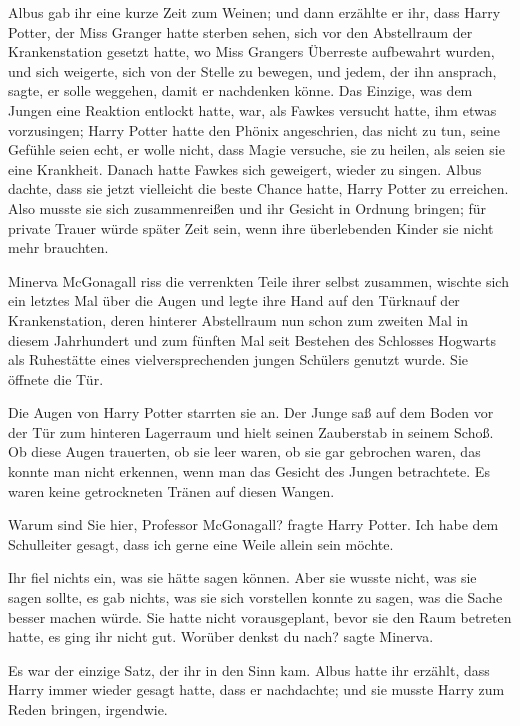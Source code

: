 Albus gab ihr eine kurze Zeit zum Weinen; und dann erzählte er ihr, dass Harry
Potter, der Miss Granger hatte sterben sehen, sich vor den Abstellraum der
Krankenstation gesetzt hatte, wo Miss Grangers Überreste aufbewahrt wurden, und
sich weigerte, sich von der Stelle zu bewegen, und jedem, der ihn ansprach,
sagte, er solle weggehen, damit er nachdenken könne. Das Einzige, was dem Jungen
eine Reaktion entlockt hatte, war, als Fawkes versucht hatte, ihm etwas
vorzusingen; Harry Potter hatte den Phönix angeschrien, das nicht zu tun, seine
Gefühle seien echt, er wolle nicht, dass Magie versuche, sie zu heilen, als
seien sie eine Krankheit. Danach hatte Fawkes sich geweigert, wieder zu singen.
Albus dachte, dass sie jetzt vielleicht die beste Chance hatte, Harry Potter zu
erreichen. Also musste sie sich zusammenreißen und ihr Gesicht in Ordnung
bringen; für private Trauer würde später Zeit sein, wenn ihre überlebenden
Kinder sie nicht mehr brauchten.

Minerva McGonagall riss die verrenkten Teile ihrer selbst zusammen, wischte sich
ein letztes Mal über die Augen und legte ihre Hand auf den Türknauf der
Krankenstation, deren hinterer Abstellraum nun schon zum zweiten Mal in diesem
Jahrhundert und zum fünften Mal seit Bestehen des Schlosses Hogwarts als
Ruhestätte eines vielversprechenden jungen Schülers genutzt wurde. Sie öffnete
die Tür.

Die Augen von Harry Potter starrten sie an. Der Junge saß auf dem Boden vor der
Tür zum hinteren Lagerraum und hielt seinen Zauberstab in seinem Schoß. Ob diese
Augen trauerten, ob sie leer waren, ob sie gar gebrochen waren, das konnte man
nicht erkennen, wenn man das Gesicht des Jungen betrachtete. Es waren keine
getrockneten Tränen auf diesen Wangen.

\glqq{}Warum sind Sie hier, Professor McGonagall?\grqq{} fragte Harry Potter.
\glqq{}Ich habe dem Schulleiter gesagt, dass ich gerne eine Weile allein sein
möchte.\grqq{}

Ihr fiel nichts ein, was sie hätte sagen können. Aber sie wusste nicht, was sie
sagen sollte, es gab nichts, was sie sich vorstellen konnte zu sagen, was die
Sache besser machen würde. Sie hatte nicht vorausgeplant, bevor sie den Raum
betreten hatte, es ging ihr nicht gut. \glqq{}Worüber denkst du nach?\grqq{}
sagte Minerva.

Es war der einzige Satz, der ihr in den Sinn kam. Albus hatte ihr erzählt, dass
Harry immer wieder gesagt hatte, dass er nachdachte; und sie musste Harry zum
Reden bringen, irgendwie.

